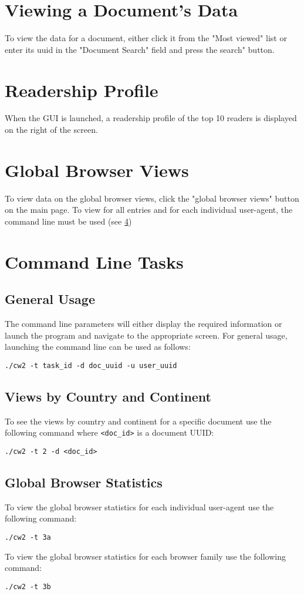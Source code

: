 \documentclass[11pt]{report}
\begin{document}
\section{Viewing a Document's Data}
To view the data for a document, either click it from the "Most viewed" list or enter its uuid in the "Document Search" field and press the search" button.
\section{Readership Profile}
When the GUI is launched, a readership profile of the top 10 readers is displayed on the right of the screen.
\section{Global Browser Views}
To view data on the global browser views, click the "global browser views" button on the main page.  To view for all entries and for each individual user-agent, the command line must be used (see \ref{usercommand})
\section{Command Line Tasks}\label{usercommand} %
\subsection{General Usage}
The command line parameters will either display the required information or launch the program and navigate to the appropriate screen.  For general usage, launching the command line can be used as follows:
\begin{lstlisting}
./cw2 -t task_id -d doc_uuid -u user_uuid
\end{lstlisting}
\subsection{Views by Country and Continent}
To see the views by country and continent for a specific document use the following command where \lstinline{<doc_id>} is a document UUID:
\begin{lstlisting}
./cw2 -t 2 -d <doc_id>
\end{lstlisting}
\subsection{Global Browser Statistics}
To view the global browser statistics for each individual user-agent use the following command:
\begin{lstlisting}
./cw2 -t 3a
\end{lstlisting}
To view the global browser statistics for each browser family use the following command:
\begin{lstlisting}
./cw2 -t 3b
\end{lstlisting}
\end{document}
